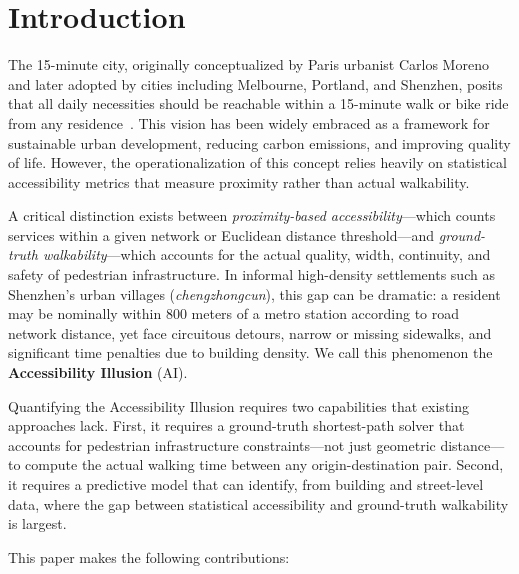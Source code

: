\documentclass[journal]{IEEEtran}
\begin{document}
\IEEEpeerreviewmaketitle

\section{Introduction}

The 15-minute city, originally conceptualized by Paris urbanist Carlos Moreno and later adopted by cities including Melbourne, Portland, and Shenzhen, posits that all daily necessities should be reachable within a 15-minute walk or bike ride from any residence~\cite{moreno2021fifteen}. This vision has been widely embraced as a framework for sustainable urban development, reducing carbon emissions, and improving quality of life. However, the operationalization of this concept relies heavily on statistical accessibility metrics that measure proximity rather than actual walkability.

A critical distinction exists between \emph{proximity-based accessibility}---which counts services within a given network or Euclidean distance threshold---and \emph{ground-truth walkability}---which accounts for the actual quality, width, continuity, and safety of pedestrian infrastructure. In informal high-density settlements such as Shenzhen's urban villages (\emph{chengzhongcun}), this gap can be dramatic: a resident may be nominally within 800 meters of a metro station according to road network distance, yet face circuitous detours, narrow or missing sidewalks, and significant time penalties due to building density. We call this phenomenon the \textbf{Accessibility Illusion} (AI).

Quantifying the Accessibility Illusion requires two capabilities that existing approaches lack. First, it requires a ground-truth shortest-path solver that accounts for pedestrian infrastructure constraints---not just geometric distance---to compute the actual walking time between any origin-destination pair. Second, it requires a predictive model that can identify, from building and street-level data, where the gap between statistical accessibility and ground-truth walkability is largest.

This paper makes the following contributions:
\end{document}
